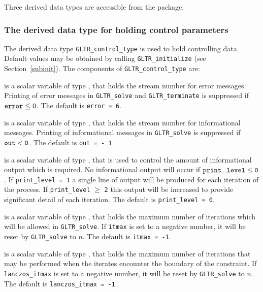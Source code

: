 \documentclass{galahad}
\newcommand{\packagename}{GL\-TR}
\begin{document}

\galtypes
Three derived data types are accessible from the package.


\subsubsection{The derived data type for holding control
 parameters}\label{typecontrol}
The derived data type
{\tt \packagename\_control\_type}
is used to hold controlling data. Default values may be obtained by calling
{\tt \packagename\_initialize}
(see Section~\ref{subinit}). The components of
{\tt \packagename\_control\_type}
are:

\begin{description}
 is a scalar variable of type \integer, that holds the
stream number for error messages.
Printing of error messages in
{\tt \packagename\_solve} and {\tt \packagename\_terminate}
is suppressed if ${\tt error} \leq {\tt 0}$.
The default is {\tt error = 6}.

 is a scalar variable of type \integer, that holds the
stream number for informational messages.
Printing of informational messages in
{\tt \packagename\_solve} is suppressed if ${\tt out} < {\tt 0}$.
The default is {\tt out = - 1}.

 is a scalar variable of type \integer,
that is used
to control the amount of informational output which is required. No
informational output will occur if ${\tt print\_level} \leq {\tt 0}$. If
{\tt print\_level = 1} a single line of output will be produced for each
iteration of the process. If {\tt print\_level} $\geq$ {\tt 2} this output
will be increased to provide significant detail of each iteration.
The default is {\tt print\_level = 0}.

 is a scalar variable of type \integer, that holds the
maximum number of iterations which will be allowed in
{\tt \packagename\_solve}.
If {\tt itmax} is set to a negative number, it will be reset by
{\tt \packagename\_solve} to $n$.
The default is {\tt itmax = -1}.

 is a scalar variable of type \integer,
that holds the
maximum number of iterations that may be performed when the iterates
encounter the boundary of the constraint.
If {\tt lanczos\_itmax} is set to a negative number, it will be reset by
{\tt \packagename\_solve} to $n$.
The default is {\tt lanczos\_itmax = -1}.


\end{description}
\end{document}

